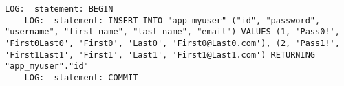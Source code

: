\begin{lstlisting}[caption={Log of Express.js initial user population creation},breaklines=true,label={lst:expressPopulateLog}]
    LOG:  statement: BEGIN
    LOG:  statement: INSERT INTO "app_myuser" ("id", "password", "username", "first_name", "last_name", "email") VALUES (1, 'Pass0!', 'First0Last0', 'First0', 'Last0', 'First0@Last0.com'), (2, 'Pass1!', 'First1Last1', 'First1', 'Last1', 'First1@Last1.com') RETURNING "app_myuser"."id"
    LOG:  statement: COMMIT
\end{lstlisting}
